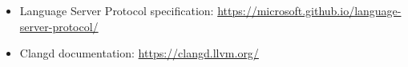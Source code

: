 \begin{itemize}
\item
Language Server Protocol specification: \url{https://microsoft.github.io/language-server-protocol/}

\item
Clangd documentation: \url{https://clangd.llvm.org/}
\end{itemize}